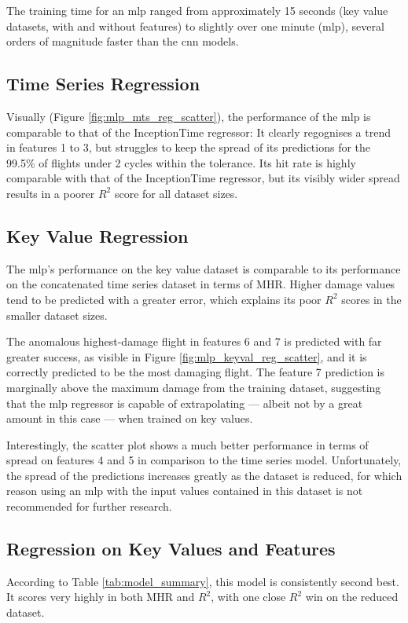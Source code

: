 The training time for an \ac{mlp} ranged from approximately 15 seconds (key value datasets, with and without features) to slightly over one minute (\ac{mlp}), several orders of magnitude faster than the \ac{cnn} models.

\subsection{Time Series Regression}
Visually (Figure \ref{fig:mlp_mts_reg_scatter}), the performance of the \ac{mlp} is comparable to that of the InceptionTime regressor: It clearly regognises a trend in features 1 to 3, but struggles to keep the spread of its predictions for the 99.5\% of flights under 2 cycles within the tolerance. Its hit rate is highly comparable with that of the InceptionTime regressor, but its visibly wider spread results in a poorer \(R^2\) score for all dataset sizes.

\subsection{Key Value Regression}
The \ac{mlp}'s performance on the key value dataset is comparable to its performance on the concatenated time series dataset in terms of MHR. Higher damage values tend to be predicted with a greater error, which explains its poor \(R^2\) scores in the smaller dataset sizes.

The anomalous highest-damage flight in features 6 and 7 is predicted with far greater success, as visible in Figure \ref{fig:mlp_keyval_reg_scatter}, and it is correctly predicted to be the most damaging flight. The feature 7 prediction is marginally above the maximum damage from the training dataset, suggesting that the \ac{mlp} regressor is capable of extrapolating --- albeit not by a great amount in this case --- when trained on key values.

Interestingly, the scatter plot shows a much better performance in terms of spread on features 4 and 5 in comparison to the time series model. Unfortunately, the spread of the predictions increases greatly as the dataset is reduced, for which reason using an \ac{mlp} with the input values contained in this dataset is not recommended for further research.

\subsection{Regression on Key Values and Features}
According to Table \ref{tab:model_summary}, this model is consistently second best. It scores very highly in both MHR and \(R^2\), with one close \(R^2\) win on the reduced dataset.


